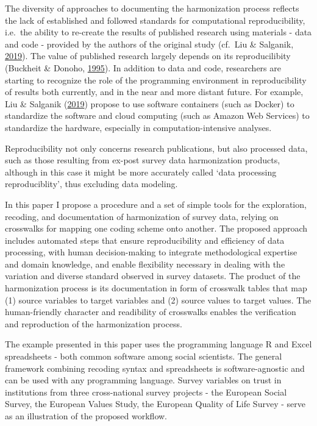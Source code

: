 \documentclass[12pt,]{article}
\begin{document}
The diversity of approaches to documenting the harmonization process reflects the lack of established and followed standards for computational reproducibility, i.e.~the ability to re-create the results of published research using materials - data and code - provided by the authors of the original study (cf.~Liu \& Salganik, \protect\hyperlink{ref-Liu2019}{2019}). The value of published research largely depends on its reproducilibity (Buckheit \& Donoho, \protect\hyperlink{ref-Buckheit1995}{1995}). In addition to data and code, researchers are starting to recognize the role of the programming environment in reproducibility of results both currently, and in the near and more distant future. For example, Liu \& Salganik (\protect\hyperlink{ref-Liu2019}{2019}) propose to use software containers (such as Docker) to standardize the software and cloud computing (such as Amazon Web Services) to standardize the hardware, especially in computation-intensive analyses.

Reproducibility not only concerns research publications, but also processed data, such as those resulting from ex-post survey data harmonization products, although in this case it might be more accurately called `data processing reproduciblity', thus excluding data modeling.

In this paper I propose a procedure and a set of simple tools for the exploration, recoding, and documentation of harmonization of survey data, relying on crosswalks for mapping one coding scheme onto another. The proposed approach includes automated steps that ensure reproducibility and efficiency of data processing, with human decision-making to integrate methodological expertise and domain knowledge, and enable flexibility necessary in dealing with the variation and diverse standard observed in survey datasets.
The product of the harmonization process is its documentation in form of crosswalk tables that map (1) source variables to target variables and (2) source values to target values. The human-friendly character and readibility of crosswalks enables the verification and reproduction of the harmonization process.

The example presented in this paper uses the programming language R and Excel spreadsheets - both common software among social scientists. The general framework combining recoding syntax and spreadsheets is software-agnostic and can be used with any programming language. Survey variables on trust in institutions from three cross-national survey projects - the European Social Survey, the European Values Study, the European Quality of Life Survey - serve as an illustration of the proposed workflow.
\end{document}
